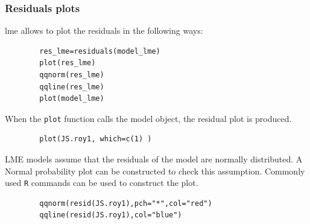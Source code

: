 \documentclass[12pt, a4paper]{report}
\theoremstyle{plain}
\theoremstyle{definition}
\theoremstyle{remark}
\begin{document}
		\subsubsection{Residuals plots}
	
	lme allows to plot the residuals in the following ways:
	
	\begin{framed}
		\begin{verbatim}
		res_lme=residuals(model_lme)
		plot(res_lme)
		qqnorm(res_lme)
		qqline(res_lme)
		plot(model_lme)
		\end{verbatim}
	\end{framed}
	
	When the \texttt{plot} function calls the model object, the residual plot is produced.
	
	
	
	
	\begin{framed}
		\begin{verbatim}
		plot(JS.roy1, which=c(1) )
		\end{verbatim}
	\end{framed}
	
	LME models assume that the residuals of the model are normally distributed. A Normal probability plot can be constructed to check this assumption. Commonly used \texttt{R} commands can be used to construct the plot.
	
	
	\begin{framed}
		\begin{verbatim}
		qqnorm(resid(JS.roy1),pch="*",col="red")
		qqline(resid(JS.roy1),col="blue")
		\end{verbatim}
	\end{framed}
	
\end{document}
